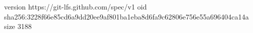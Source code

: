 version https://git-lfs.github.com/spec/v1
oid sha256:3228f66e85cd6a9dd20ee9af801ba1eba8d6fa9c62806e756e55a696404ca14a
size 3188
